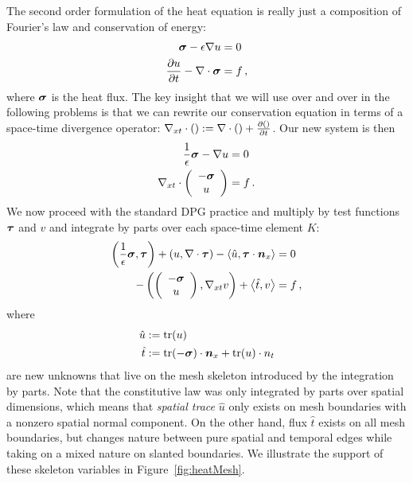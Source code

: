 \documentclass[Dissertation.tex]{subfiles}
\begin{document}
The second order formulation of the heat equation is really just a composition of Fourier's law and conservation of energy:
\begin{equation}
\label{eq:heatFirstOrder}
\begin{aligned}
\boldsymbol\sigma-\epsilon\nabla u&=0\\
\frac{\partial u}{\partial t}-\nabla\cdot\boldsymbol\sigma&=f\,,
\end{aligned}
\end{equation}
where $\boldsymbol\sigma$ is the heat flux.
The key insight that we will use over and over in the following problems is that we can rewrite our conservation equation
in terms of a space-time divergence operator: $\nabla_{xt}\cdot():=\nabla\cdot()+\frac{\partial()}{\partial t}$.
Our new system is then
\begin{equation}
\label{eq:heatFirstOrderSpaceTime}
\begin{aligned}
\frac{1}{\epsilon}\boldsymbol\sigma-\nabla u&=0\\
\nabla_{xt}\cdot\left( \begin{array}{c} -\boldsymbol\sigma\\ u\\ \end{array} \right)&=f\,.
\end{aligned}
\end{equation}
We now proceed with the standard DPG practice and multiply by test functions $\boldsymbol\tau$ and $v$ 
and integrate by parts over each space-time element $K$:
\begin{equation}
\label{eq:heatBF}
\begin{aligned}
\left( \frac{1}{\epsilon}\boldsymbol\sigma,\boldsymbol\tau \right)+\left( u,\nabla\cdot\boldsymbol\tau \right)-\left\langle \hat u,\boldsymbol\tau\cdot\boldsymbol n_x \right\rangle&=0\\
-\left( \left( \begin{array}{c} -\boldsymbol\sigma\\ u\\ \end{array} \right),\nabla_{xt} v \right)+\left\langle \hat t,v \right\rangle&=f\,,
\end{aligned}
\end{equation}
where
\begin{align*}
\hat u&:=\operatorname*{tr}(u)\\
\hat t&:=\operatorname*{tr}(-\boldsymbol\sigma)\cdot\boldsymbol n_x+\operatorname*{tr}(u)\cdot n_t
\end{align*}
are new unknowns that live on the mesh skeleton introduced by the integration by parts.
Note that the constitutive law was only integrated by parts over spatial dimensions, which means 
that \emph{spatial trace} $\hat u$ only exists on mesh boundaries with a nonzero spatial normal component.
On the other hand, flux $\hat t$ exists on all mesh boundaries, but changes nature between pure spatial and temporal edges while taking on 
a mixed nature on slanted boundaries. We illustrate the support of these skeleton variables in Figure~\ref{fig:heatMesh}.
\end{document}
